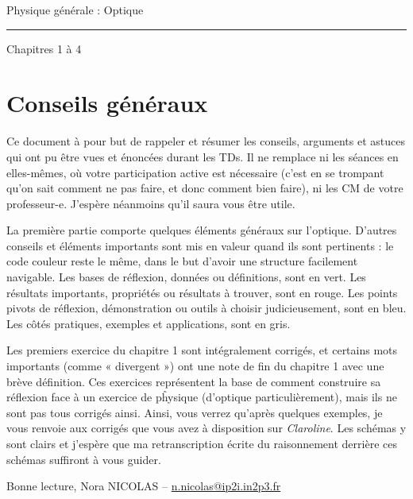 \documentclass[10pt,a5paper,notitlepage]{book}
\begin{document}
\begin{center}
\Huge Physique générale : Optique\smallbreak\vspace*{-14pt}
\rule[11pt]{5cm}{0.5pt}\smallbreak\vspace*{-14pt}
\huge Chapitres 1 à 4
\end{center}

\toccontents

\setcounter{chapter}{-1}
\chapter{Conseils généraux}
\vspace*{-47pt}
Ce document à pour but de rappeler et résumer les conseils, arguments et astuces
qui ont pu être vues et énoncées durant les TDs. Il ne remplace ni les séances
en elles-mêmes, où votre participation active est nécessaire (c'est en se
trompant qu'on sait comment ne pas faire, et donc comment bien faire), ni les CM
de votre professeur-e. J'espère néanmoins qu'il saura vous être utile.
\smallbreak

La première partie comporte quelques éléments généraux sur l'optique. D'autres
conseils et éléments importants sont mis en valeur quand ils sont pertinents :
le code couleur reste le même, dans le but d'avoir une structure facilement
navigable. Les bases de réflexion, données ou définitions, sont en vert. Les
résultats importants, propriétés ou résultats à trouver, sont en rouge. Les
points pivots de réflexion, démonstration ou outils à choisir judicieusement,
sont en bleu. Les côtés pratiques, exemples et applications, sont en gris.
\smallbreak

Les premiers exercice du chapitre 1 sont intégralement corrigés, et certains
mots importants (comme « divergent ») ont une note de fin du chapitre 1 avec une
brève définition. Ces exercices représentent la base de comment construire sa
réflexion face à un exercice de pĥysique (d'optique particulièrement), mais ils
ne sont pas tous corrigés ainsi. Ainsi, vous verrez qu'après quelques exemples,
je vous renvoie aux corrigés que vous avez à disposition sur \textit{Claroline}.
Les schémas y sont clairs et j'espère que ma retranscription écrite du
raisonnement derrière ces schémas suffiront à vous guider. \smallbreak

Bonne lecture, \hfill Nora NICOLAS --
\href{mailto:n.nicolas@ip2i.in2p3.fr}{n.nicolas@ip2i.in2p3.fr}\\
\end{document}
